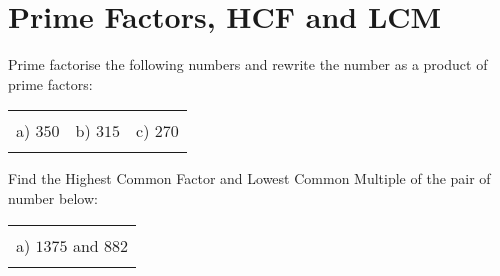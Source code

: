 \documentclass[12pt]{article}
\begin{document}
\section{Prime Factors, HCF and LCM}
Prime factorise the following numbers and rewrite the number as a product of prime factors:
\begin{table}[h!]
\centering
\begin{tabular}{c c c}
\hspace{4cm} & \hspace{4cm} & \hspace{4cm} \\
a) $350$ & b) $315$ & c) $270$\\ \\
\end{tabular}
\end{table}
\newline
Find the Highest Common Factor and Lowest Common Multiple of the pair of number below:
\begin{table}[h!]
\centering
\begin{tabular}{c}
\hspace{4cm}\\
a) $1375$ and $882$\\ \\
\end{tabular}
\end{table}
\newline
\end{document}
